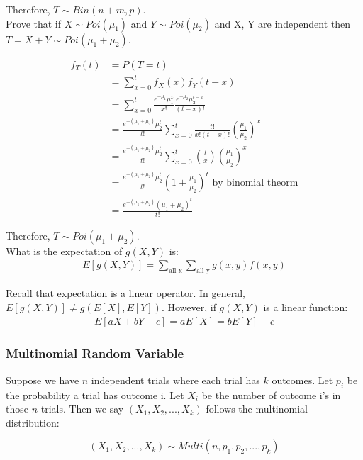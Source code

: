 \documentclass[12pt, letterpaper]{article}
\begin{document}
Therefore, $T \sim Bin(n + m, p)$.\\

Prove that if $X \sim Poi(\mu_1)$ and $Y \sim Poi(\mu_2)$ and X, Y are independent then $T = X + Y \sim Poi(\mu_1 + \mu_2)$.

\begin{align*}
f_T \left(t\right) &= P\left(T = t\right)\\
&= \sum_{x = 0}^{t} f_X \left(x\right) f_Y \left(t - x\right)\\
&= \sum_{x = 0}^{t} \frac{e^{-\mu_1} \mu_1^x}{x!} \frac{e^{-\mu_2} \mu_2^{t - x}}{(t - x)!}\\
&= \frac{e^{-(\mu_1 + \mu_2)} \mu_2^t}{t!} \sum_{x = 0}^{t} \frac{t!}{x! (t - x)!} \left(\frac{\mu_1}{\mu_2}\right)^x\\
&= \frac{e^{-(\mu_1 + \mu_2)} \mu_2^t}{t!} \sum_{x = 0}^{t} {{t} \choose {x}} \left(\frac{\mu_1}{\mu_2}\right)^x\\
&= \frac{e^{-(\mu_1 + \mu_2)} \mu_2^t}{t!} \left(1 + \frac{\mu_1}{\mu_2}\right)^t \text{ by binomial theorm}\\
&= \frac{e^{-(\mu_1 + \mu_2)} (\mu_1 + \mu_2)^t}{t!}
\end{align*}

Therefore, $T \sim Poi(\mu_1 + \mu_2)$.\\

What is the expectation of $g(X, Y)$ is:
\begin{align*}
E[g\left(X, Y\right)] = \sum_{\text{all x}} \sum_{\text{all y}} g\left(x, y\right) f\left(x, y\right)
\end{align*}

Recall that expectation is a linear operator. In general, $E[g\left(X, Y\right)] \neq g(E[X], E[Y])$. However, if $g(X, Y)$ is a linear function:
\begin{align*}
E[aX + bY + c] = aE[X] = bE[Y] + c
\end{align*}

\subsubsection{Multinomial Random Variable}
Suppose we have $n$ independent trials where each trial has $k$ outcomes. Let $p_i$ be the probability a trial has outcome i. Let $X_i$ be the number of outcome i's in those $n$ trials. Then we say $(X_1, X_2, ..., X_k)$ follows the multinomial distribution:

\begin{equation}
(X_1, X_2, ..., X_k) \sim Multi(n, p_1, p_2, ..., p_k)
\end{equation}\\
\end{document}
